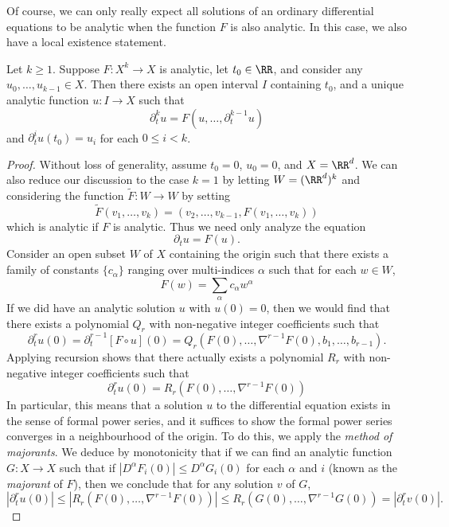 Of course, we can only really expect all solutions of an ordinary differential equations to be analytic when the function $F$ is also analytic. In this case, we also have a local existence statement.

\begin{lemma}
    Let $k \geq 1$. Suppose $F: X^k \to X$ is analytic, let $t_0 \in \RR$, and consider any $u_0,\dots,u_{k-1} \in X$. Then there exists an open interval $I$ containing $t_0$, and a unique analytic function $u: I \to X$ such that
    \[ \partial_t^k u = F(u,\dots,\partial_t^{k-1} u) \]
    and $\partial_t^i u(t_0) = u_i$ for each $0 \leq i < k$.
\end{lemma}
\begin{proof}
    Without loss of generality, assume $t_0 = 0$, $u_0 = 0$, and $X = \RR^d$. We can also reduce our discussion to the case $k = 1$ by letting $W = (\RR^d)^k$ and considering the function $\tilde{F}: W \to W$ by setting
    \[ \tilde{F}(v_1,\dots,v_k) = (v_2,\dots,v_{k-1},F(v_1,\dots,v_k)) \]
    which is analytic if $F$ is analytic. Thus we need only analyze the equation
    \[ \partial_t u = F(u). \]
    Consider an open subset $W$ of $X$ containing the origin such that there exists a family of constants $\{ c_\alpha \}$ ranging over multi-indices $\alpha$ such that for each $w \in W$,
    \[ F(w) = \sum_\alpha c_\alpha w^\alpha \]
    If we did have an analytic solution $u$ with $u(0) = 0$, then we would find that there exists a polynomial $Q_r$ with non-negative integer coefficients such that
    \[ \partial_t^r u(0) = \partial_t^{r-1} [F \circ u](0) = Q_r(F(0),\dots,\nabla^{r-1} F(0),b_1,\dots,b_{r-1}). \]
    Applying recursion shows that there actually exists a polynomial $R_r$ with non-negative integer coefficients such that
    \[ \partial_t^r u(0) = R_r(F(0),\dots,\nabla^{r-1} F(0)) \]
    In particular, this means that a solution $u$ to the differential equation exists in the sense of formal power series, and it suffices to show the formal power series converges in a neighbourhood of the origin. To do this, we apply the \emph{method of majorants}. We deduce by monotonicity that if we can find an analytic function $G: X \to X$ such that if $|D^\alpha F_i(0)| \leq D^\alpha G_i(0)$ for each $\alpha$ and $i$ (known as the \emph{majorant} of $F$), then we conclude that for any solution $v$ of $G$,
    \[ |\partial_t^r u(0)| \leq |R_r(F(0),\dots,\nabla^{r-1} F(0))| \leq R_r(G(0),\dots,\nabla^{r-1}G(0)) = |\partial_t^r v(0)|. \]

\end{proof}
